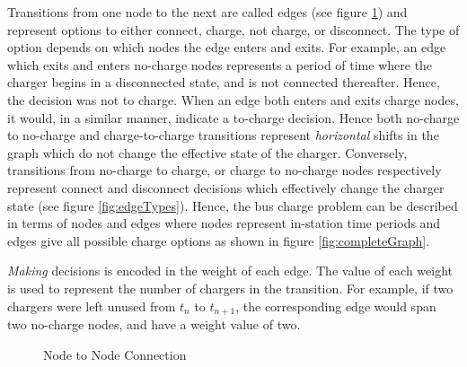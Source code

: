 \begin{figure*}
{
	}
		\caption{Bus availability represented in a graph}
		\label{fig:busAvailComparison}
\end{figure*}

\par Transitions from one node to the next are called edges (see figure \ref{fig:edgeNodeRel}) and represent options to either connect, charge, not charge, or disconnect. The type of option depends on which nodes the edge enters and exits. For example, an edge which exits and enters no-charge nodes represents a period of time where the charger begins in a disconnected state, and is not connected thereafter. Hence, the decision was not to charge. When an edge both enters and exits charge nodes, it would, in a similar manner, indicate a to-charge decision. Hence both no-charge to no-charge and charge-to-charge transitions represent \textit{horizontal} shifts in the graph which do not change the effective state of the charger. Conversely, transitions from no-charge to charge, or charge to no-charge nodes respectively represent connect and disconnect decisions which effectively change the charger state (see figure \ref{fig:edgeTypes}). Hence, the bus charge problem can be described in terms of nodes and edges where nodes represent in-station time periods and edges give all possible charge options as shown in figure \ref{fig:completeGraph}.
\par \textit{Making} decisions is encoded in the weight of each edge.  The value of each weight is used to represent the number of chargers in the transition. For example, if two chargers were left unused from $t_n$ to $t_{n+1}$, the corresponding edge would span two no-charge nodes, and have a weight value of two.

\begin{figure}
	\centering
	\caption{Node to Node Connection}
	\label{fig:edgeNodeRel}
\end{figure}

